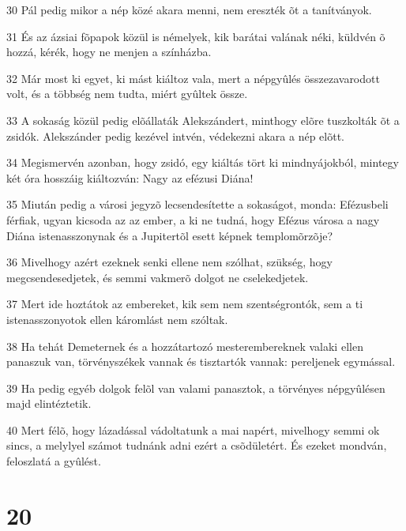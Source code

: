 \par 30 Pál pedig mikor a nép közé akara menni, nem ereszték õt a tanítványok.
\par 31 És az ázsiai fõpapok közül is némelyek, kik barátai valának néki, küldvén õ hozzá, kérék, hogy ne menjen a színházba.
\par 32 Már most ki egyet, ki mást kiáltoz vala, mert a népgyûlés összezavarodott volt, és a többség nem tudta, miért gyûltek össze.
\par 33 A sokaság közül pedig elõállaták Alekszándert, minthogy elõre tuszkolták õt a zsidók. Alekszánder pedig kezével intvén, védekezni akara a nép elõtt.
\par 34 Megismervén azonban, hogy zsidó, egy kiáltás tört ki mindnyájokból, mintegy két óra hosszáig kiáltozván: Nagy az efézusi Diána!
\par 35 Miután pedig a városi jegyzõ lecsendesítette a sokaságot, monda: Efézusbeli férfiak, ugyan kicsoda az az ember, a ki ne tudná, hogy Efézus városa a nagy Diána istenasszonynak és a Jupitertõl esett képnek templomõrzõje?
\par 36 Mivelhogy azért ezeknek senki ellene nem szólhat, szükség, hogy megcsendesedjetek, és semmi vakmerõ dolgot ne cselekedjetek.
\par 37 Mert ide hoztátok az embereket, kik sem nem szentségrontók, sem a ti istenasszonyotok ellen káromlást nem szóltak.
\par 38 Ha tehát Demeternek és a hozzátartozó mesterembereknek valaki ellen panaszuk van, törvényszékek vannak és tisztartók vannak: pereljenek egymással.
\par 39 Ha pedig egyéb dolgok felõl van valami panasztok, a törvényes népgyûlésen majd elintéztetik.
\par 40 Mert félõ, hogy lázadással vádoltatunk a mai napért, mivelhogy semmi ok sincs, a melylyel számot tudnánk adni ezért a csõdületért. És ezeket mondván, feloszlatá a gyûlést.

\chapter{20}

